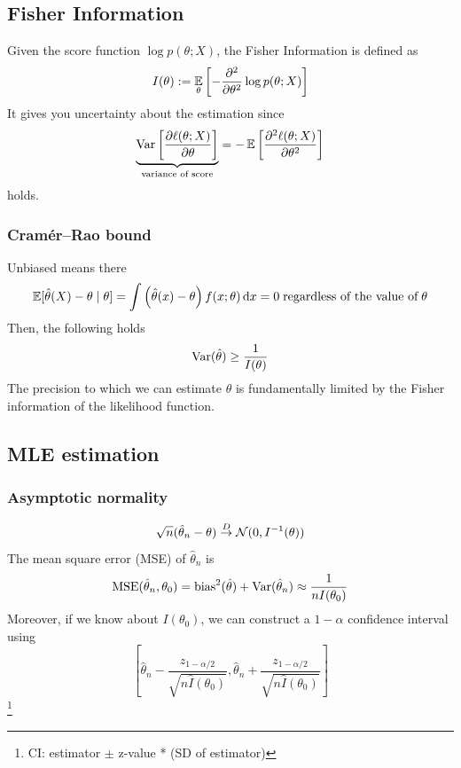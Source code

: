 \documentclass[10pt]{article}
\begin{document}
\subsection{Fisher Information}
Given the score function $\log p(\theta; X)$, the Fisher Information is defined as
\begin{equation}
    I(\theta) := \mathop{\mathbb{E} \displaystyle}_{\theta}\left[ - \frac{\partial^2}{\partial \theta^2} \log p(\theta; X)\right]
\end{equation}
It gives you uncertainty about the estimation since 
\begin{equation}
    \underbrace{\mathrm{Var} \left[ \frac{\partial \ell (\theta ; X)}{\partial \theta}\right]}_{\text{variance of score}} = - \mathop{\mathbb{E} \displaystyle} \left[ \frac{\partial^2 \ell(\theta ; X)}{\partial \theta^2} \right]
\end{equation}
holds. 
\subsubsection{Cramér–Rao bound}
Unbiased means there 
\begin{equation}
    \E[\hat{\theta}(X) - \theta \given \theta] = \int \left( \hat{\theta}(x) - \theta \right) f(x; \theta) \dd{x} = 0 \mtext{regardless of the value of} \theta
\end{equation}
Then, the following holds 
\begin{equation}
    \mathrm{Var}(\hat{\theta}) \geq \frac{1}{I(\theta)}
\end{equation}
The precision to which we can estimate $\theta$ is fundamentally limited by the Fisher information of the likelihood function.
\subsection{MLE estimation}
\subsubsection{Asymptotic normality}
\begin{equation}
    \sqrt{n} (\hat{\theta}_n - \theta) \overset{D}{\rightarrow} \mathcal{N}(0, I^{-1}(\theta))
\end{equation}
The mean square error (MSE) of $\hat{\theta}_n$ is 
\begin{equation}
    \text{MSE}(\hat{\theta}_n, \theta_0) = \text{bias}^2(\hat{\theta}) + \mathrm{Var} (\hat{\theta}_n) \approx \frac{1}{n I(\theta_0)}
\end{equation}
Moreover, if we know about $I(\theta_0)$, we can construct a $1-\alpha$ confidence interval using 
\begin{equation}
    \left[ \hat{\theta}_n - \frac{z_{1-\alpha/2}}{\sqrt{n \hat{I}(\theta_0)}}, \hat{\theta}_n + \frac{z_{1- \alpha/2}}{\sqrt{n \hat{I}(\theta_0)}}\right] 
\end{equation}\footnote{CI: estimator $\pm$ z-value * (SD of estimator)}
\end{document}

